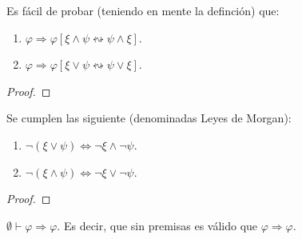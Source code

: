 \documentclass[12pt]{report}
\theoremstyle{largebreak}
\begin{document}
    \begin{obs}
        Es fácil de probar (teniendo en mente la definción) que:
        \begin{enumerate}
            \item $\varphi\Rightarrow\varphi[\xi\land\psi\leftrightsquigarrow \psi\land\xi]$.
            \item $\varphi\Rightarrow\varphi[\xi\lor\psi\leftrightsquigarrow \psi\lor\xi]$.
        \end{enumerate}
    \end{obs}

    \begin{proof}
        
    \end{proof}

    \begin{propo}
        Se cumplen las siguiente (denominadas Leyes de Morgan):
        \begin{enumerate}
            \item $\neg(\xi\lor\psi)\iff \neg\xi\land\neg\psi$.
            \item $\neg(\xi\land\psi)\iff \neg\xi\lor\neg\psi$.
        \end{enumerate}
    \end{propo}

    \begin{proof}
        
    \end{proof}

    \begin{lema}
        $\emptyset\vdash\varphi\Rightarrow\varphi$. Es decir, que sin premisas es válido que $\varphi\Rightarrow\varphi$.
    \end{lema}
\end{document}
